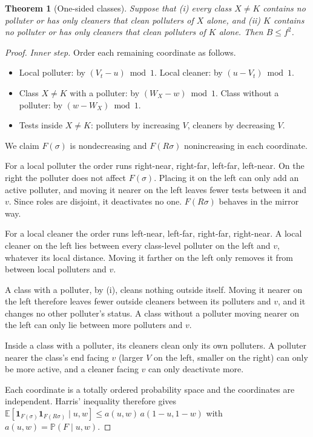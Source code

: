 \documentclass[11pt,a4paper]{article}
\newtheorem{theorem}{Theorem}[section]
\theoremstyle{definition}\newtheorem{definition}[theorem]{Definition}
\theoremstyle{remark}\newtheorem{remark}[theorem]{Remark}
\newcommand{\E}{\mathbb E}
\newcommand{\Prb}{\mathbb P}
\theoremstyle{definition}\newtheorem{xexample}[xtheorem]{Example}\theoremstyle{plain}
\begin{document}
\begin{theorem}[One-sided classes]\label{thm:onesided}
Suppose that (i) every class $X\ne K$ contains no polluter or has only cleaners that clean polluters of $X$ alone, and (ii) $K$ contains no polluter or has only cleaners that clean polluters of $K$ alone. Then $B\le f^2$.
\end{theorem}
\begin{proof}
\emph{Inner step.} Order each remaining coordinate as follows.
\begin{itemize}
\item Local polluter: by $(V_t-u)\bmod1$. Local cleaner: by $(u-V_t)\bmod1$.
\item Class $X\ne K$ with a polluter: by $(W_X-w)\bmod1$. Class without a polluter: by $(w-W_X)\bmod1$.
\item Tests inside $X\ne K$: polluters by increasing $V$, cleaners by decreasing $V$.
\end{itemize}
We claim $F(\sigma)$ is nondecreasing and $F(R\sigma)$ nonincreasing in each coordinate.

For a local polluter the order runs right-near, right-far, left-far, left-near. On the right the polluter does not affect $F(\sigma)$. Placing it on the left can only add an active polluter, and moving it nearer on the left leaves fewer tests between it and $v$. Since roles are disjoint, it deactivates no one. $F(R\sigma)$ behaves in the mirror way.

For a local cleaner the order runs left-near, left-far, right-far, right-near. A local cleaner on the left lies between every class-level polluter on the left and $v$, whatever its local distance. Moving it farther on the left only removes it from between local polluters and $v$.

A class with a polluter, by (i), cleans nothing outside itself. Moving it nearer on the left therefore leaves fewer outside cleaners between its polluters and $v$, and it changes no other polluter's status. A class without a polluter moving nearer on the left can only lie between more polluters and $v$.

Inside a class with a polluter, its cleaners clean only its own polluters. A polluter nearer the class's end facing $v$ (larger $V$ on the left, smaller on the right) can only be more active, and a cleaner facing $v$ can only deactivate more.

Each coordinate is a totally ordered probability space and the coordinates are independent. Harris' inequality therefore gives $\E[\mathbf 1_{F(\sigma)}\mathbf 1_{F(R\sigma)}\mid u,w]\le a(u,w)\,a(1-u,1-w)$ with $a(u,w)=\Prb(F\mid u,w)$.


\end{proof}
\end{document}
